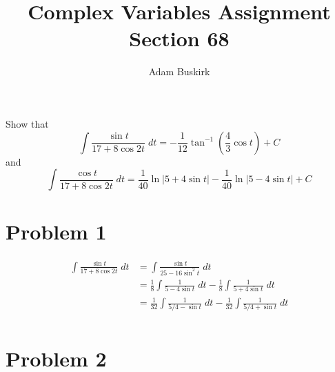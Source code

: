 \documentclass{article}
\title{Complex Variables Assignment Section 68}
\author{Adam Buskirk}
\theoremstyle{definition}
\newcommand{\p}[1]{\left(#1\right)}
\newcommand{\abs}[1]{\left|#1\right|}
\begin{document}
\maketitle

Show that 
\[
\int \frac{\sin t}{17+8 \cos 2 t} \;dt = -\frac{1}{12} \tan^{-1}\p{\frac{4}{3} \cos t} + C
\]
and
\[
\int \frac{\cos t}{17+8 \cos 2t} \;dt 
= \frac{1}{40} \ln \abs{5+4\sin t} - \frac{1}{40} \ln\abs{5-4\sin t} + C
\]

\section{Problem 1}
\begin{align*}
\int \frac{\sin t}{17+8\cos 2t} \;dt
&= \int \frac{\sin t}{25-16 \sin^2 t} \;dt \tag{Double-angle formula} \\
&= \frac{1}{8} \int \frac{1}{5-4\sin t} \;dt 
- \frac{1}{8} \int \frac{1}{5+4\sin t} \;dt \\
&= \frac{1}{32} \int \frac{1}{5/4-\sin t} \;dt 
- \frac{1}{32} \int \frac{1}{5/4+\sin t} \;dt \\
\end{align*}

\section{Problem 2}
\begin{align*}
\end{align*}
\end{document}
